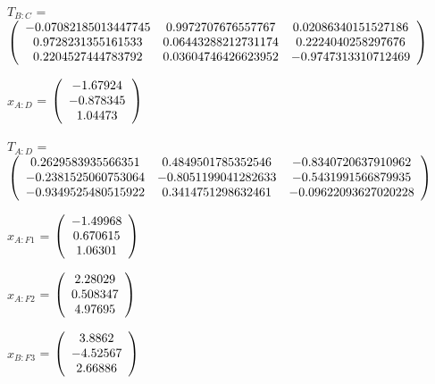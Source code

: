 \begin{description}
$T_{B:C}$ = $\left( \begin{array} {ccc} 
   -0.07082185013447745 & 0.9972707676557767 & 0.02086340151527186 \\
   0.9728231355161533 & 0.06443288212731174 & 0.2224040258297676 \\
   0.2204527444783792 & 0.03604746426623952 & -0.9747313310712469 \\
\end{array} \right)\\ \\$
             
$x_{A:D}$ = $\left( \begin{array} {ccc}   -1.67924 \\  -0.878345 \\    1.04473
\end{array} \right)\\ \\$

$T_{A:D}$ = $\left( \begin{array} {ccc} 
   0.2629583935566351 & 0.4849501785352546 & -0.8340720637910962 \\ 
   -0.2381525060753064 & -0.8051199041282633 & -0.5431991566879935 \\
   -0.9349525480515922 & 0.3414751298632461 & -0.09622093627020228 \\
\end{array} \right)\\ \\$
             
$x_{A:F1}$ = $\left( \begin{array} {ccc}   -1.49968 \\   0.670615 \\    1.06301
\end{array} \right)\\ \\$
              
$x_{A:F2}$ = $\left( \begin{array} {ccc}    2.28029 \\   0.508347 \\    4.97695
\end{array} \right)\\ \\$
              
$x_{B:F3}$ = $\left( \begin{array} {ccc}     3.8862 \\   -4.52567 \\    2.66886
\end{array} \right)\\ \\$
              

\end{description}
